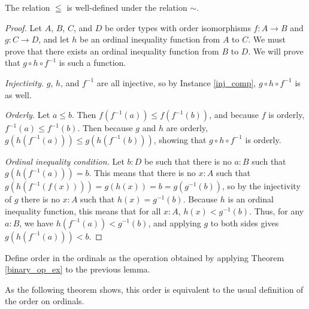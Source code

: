 \documentclass[../../math.tex]{subfiles}
\begin{document}
\begin{lemma}
    The relation $\leqq$ is well-defined under the relation $\sim$.
\end{lemma}
\begin{proof}
    Let $A$, $B$, $C$, and $D$ be order types with order isomorphisms $f : A \to
    B$ and $g : C \to D$, and let $h$ be an ordinal inequality function from $A$
    to $C$.  We must prove that there exists an ordinal inequality function from
    $B$ to $D$.  We will prove that $g \circ h \circ f^{-1}$ is such a function.

    \noindent \textit{Injectivity.}
    $g$, $h$, and $f^{-1}$ are all injective, so by Instance \ref{inj_comp}, $g
    \circ h \circ f^{-1}$ is as well.

    \noindent \textit{Orderly.}
    Let $a \leq b$.  Then $f(f^{-1}(a)) \leq f(f^{-1}(b))$, and because $f$ is
    orderly, $f^{-1}(a) \leq f^{-1}(b)$.  Then because $g$ and $h$ are orderly,
    $g(h(f^{-1}(a))) \leq g(h(f^{-1}(b)))$, showing that $g \circ h \circ
    f^{-1}$ is orderly.

    \noindent \textit{Ordinal inequality condition.}
    Let $b : D$ be such that there is no $a : B$ such that $g(h(f^{-1}(a))) =
    b$.  This means that there is no $x : A$ such that $g(h(f^{-1}(f(x)))) =
    g(h(x)) = b = g(g^{-1}(b))$, so by the injectivity of $g$ there is no $x :
    A$ such that $h(x) = g^{-1}(b)$.  Because $h$ is an ordinal inequality
    function, this means that for all $x : A$, $h(x) < g^{-1}(b)$.  Thus, for
    any $a : B$, we have $h(f^{-1}(a)) < g^{-1}(b)$, and applying $g$ to both
    sides gives $g(h(f^{-1}(a))) < b$.
\end{proof}

\begin{instance}
    Define order in the ordinals as the operation obtained by applying Theorem
    \ref{binary_op_ex} to the previous lemma.
\end{instance}

As the following theorem shows, this order is equivalent to the usual definition
of the order on ordinals.
\end{document}
